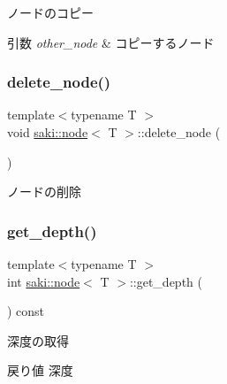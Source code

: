 ノードのコピー 


\begin{DoxyParams}{引数}
{\em other\+\_\+node} & コピーするノード \\
\hline
\end{DoxyParams}
\mbox{\label{classsaki_1_1node_aa850971614e4ee17f3a3c88a430d4cde}} 
\subsubsection{\texorpdfstring{delete\+\_\+node()}{delete\_node()}}
{\footnotesize\ttfamily template$<$typename T $>$ \\
void \mbox{\hyperlink{classsaki_1_1node}{saki\+::node}}$<$ T $>$\+::delete\+\_\+node (\begin{DoxyParamCaption}{ }\end{DoxyParamCaption})\hspace{0.3cm}{\ttfamily [inline]}}



ノードの削除 

\mbox{\label{classsaki_1_1node_a9ca34dd5d8d628bc814ee5dbfbafc75b}} 
\subsubsection{\texorpdfstring{get\+\_\+depth()}{get\_depth()}}
{\footnotesize\ttfamily template$<$typename T $>$ \\
int \mbox{\hyperlink{classsaki_1_1node}{saki\+::node}}$<$ T $>$\+::get\+\_\+depth (\begin{DoxyParamCaption}{ }\end{DoxyParamCaption}) const\hspace{0.3cm}{\ttfamily [inline]}}



深度の取得 

\begin{DoxyReturn}{戻り値}
深度 
\end{DoxyReturn}
\mbox{\label{classsaki_1_1node_ac04bef91932299fe08f488de21f703b3}} 
